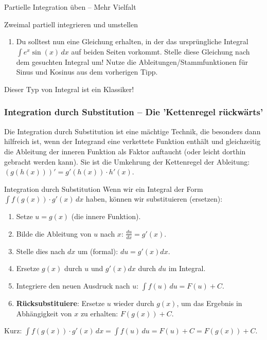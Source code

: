\begin{aufgabenumgebung}{Partielle Integration üben – Mehr Vielfalt}
\begin{enumerate}
\begin{tippumgebung}{Zweimal partiell integrieren und umstellen}
\begin{enumerate}
            \item Du solltest nun eine Gleichung erhalten, in der das ursprüngliche Integral $\int e^x \sin(x) \,dx$ auf beiden Seiten vorkommt. Stelle diese Gleichung nach dem gesuchten Integral um! Nutze die Ableitungen/Stammfunktionen für Sinus und Kosinus aus dem vorherigen Tipp.
        \end{enumerate}
        Dieser Typ von Integral ist ein Klassiker!
        \end{tippumgebung}
\end{enumerate}
\end{aufgabenumgebung}

\subsubsection{Integration durch Substitution – Die 'Kettenregel rückwärts'}
\label{subsubsec:integration_substitution}

Die Integration durch Substitution ist eine mächtige Technik, die besonders dann hilfreich ist, wenn der Integrand eine verkettete Funktion enthält und gleichzeitig die Ableitung der inneren Funktion als Faktor auftaucht (oder leicht dorthin gebracht werden kann). Sie ist die Umkehrung der Kettenregel der Ableitung: $(g(h(x)))' = g'(h(x)) \cdot h'(x)$.

\begin{merksatzumgebung}{Integration durch Substitution}
Wenn wir ein Integral der Form $\int f(g(x)) \cdot g'(x) \,dx$ haben, können wir substituieren (ersetzen):
\begin{enumerate}
    \item Setze $u = g(x)$ (die innere Funktion).
    \item Bilde die Ableitung von $u$ nach $x$: $\frac{du}{dx} = g'(x)$.
    \item Stelle dies nach $dx$ um (formal): $du = g'(x)dx$.
    \item Ersetze $g(x)$ durch $u$ und $g'(x)dx$ durch $du$ im Integral.
    \item Integriere den neuen Ausdruck nach $u$: $\int f(u) \,du = F(u) + C$.
    \item \textbf{Rücksubstituiere}: Ersetze $u$ wieder durch $g(x)$, um das Ergebnis in Abhängigkeit von $x$ zu erhalten: $F(g(x)) + C$.
\end{enumerate}
Kurz: $\int f(g(x)) \cdot g'(x) \,dx = \int f(u) \,du = F(u) + C = F(g(x)) + C$.
\end{merksatzumgebung}

